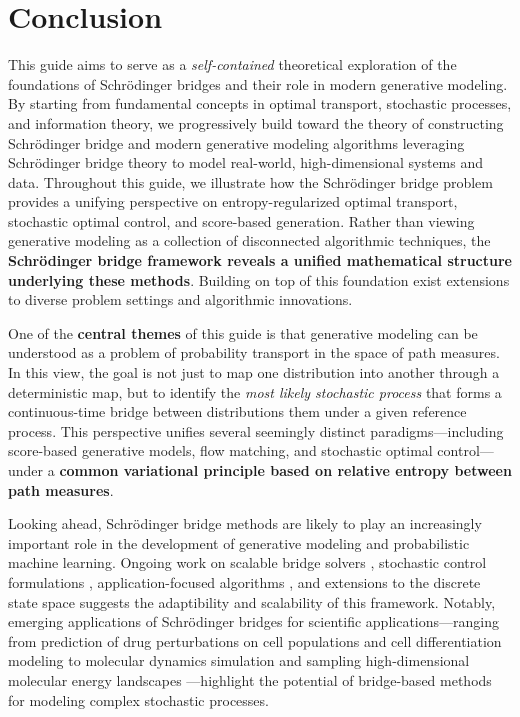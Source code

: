 \documentclass{article}
\begin{document}
\newpage 
\section{Conclusion}

This guide aims to serve as a \textit{self-contained} theoretical exploration of the foundations of Schrödinger bridges and their role in modern generative modeling. By starting from fundamental concepts in optimal transport, stochastic processes, and information theory, we progressively build toward the theory of constructing Schrödinger bridge and modern generative modeling algorithms leveraging Schrödinger bridge theory to model real-world, high-dimensional systems and data. Throughout this guide, we illustrate how the Schrödinger bridge problem provides a unifying perspective on entropy-regularized optimal transport, stochastic optimal control, and score-based generation. Rather than viewing generative modeling as a collection of disconnected algorithmic techniques, the \textbf{Schrödinger bridge framework reveals a unified mathematical structure underlying these methods}. Building on top of this foundation exist extensions to diverse problem settings and algorithmic innovations.

One of the \textbf{central themes} of this guide is that generative modeling can be understood as a problem of probability transport in the space of path measures. In this view, the goal is not just to map one distribution into another through a deterministic map, but to identify the \textit{most likely stochastic process} that forms a continuous-time bridge between distributions them under a given reference process. This perspective unifies several seemingly distinct paradigms—including score-based generative models, flow matching, and stochastic optimal control—under a \textbf{common variational principle based on relative entropy between path measures}. 

Looking ahead, Schrödinger bridge methods are likely to play an increasingly important role in the development of generative modeling and probabilistic machine learning. Ongoing work on scalable bridge solvers \citep{gushchin2024light, zhang2025learning}, stochastic control formulations \citep{liu2025adjoint, tang2025entangledsbm}, application-focused algorithms \citep{li2025diffusion, li2025bridge}, and extensions to the discrete state space \citep{guo2026discrete, ksenofontov2025categorical} suggests the adaptibility and scalability of this framework. Notably, emerging applications of Schrödinger bridges for scientific applications—ranging from prediction of drug perturbations on cell populations \citep{tang2026branchsbm} and cell differentiation modeling \citep{zhang2024learning} to molecular dynamics simulation \citep{du2024doob, tang2025entangledsbm} and sampling high-dimensional molecular energy landscapes \citep{liu2025adjoint}—highlight the potential of bridge-based methods for modeling complex stochastic processes.
\end{document}
